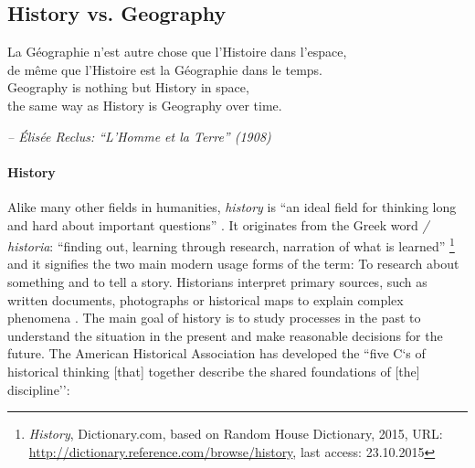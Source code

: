 \subsection{History vs. Geography} %
\label{sub:history_vs_geography}

\begin{quoteit}
La Géographie n’est autre chose que l’Histoire dans l’espace, \\
de même que l’Histoire est la Géographie dans le temps. \\[1.0em]
Geography is nothing but History in space, \\
the same way as History is Geography over time.
\end{quoteit}
\hfill \textit{-- Élisée Reclus: ``L'Homme et la Terre'' (1908)}

\paragraph{History} %
\label{par:history}


Alike many other fields in humanities, \emph{history} is ``an ideal field for thinking long and hard about important questions''
\cite{ahaFiveCs}.
It originates from the Greek word \emph{\textIota\textsigma\texttau\textomikron\textrho\textiota\textalpha / historia}: ``finding out, learning through research, narration of what is learned''
\footnote{
  \emph{History},
  Dictionary.com, based on Random House Dictionary, 2015,
  URL: \url{http://dictionary.reference.com/browse/history},
  last access: 23.10.2015
}
and it signifies the two main modern usage forms of the term: To research about something and to tell a story. Historians interpret primary sources, such as written documents, photographs or historical maps to explain complex phenomena \cite[pp.4-7]{knowles2008placing}. The main goal of history is to study processes in the past to understand the situation in the present and make reasonable decisions for the future. The American Historical Association has developed the ``five C`s of historical thinking [that] together describe the shared foundations of [the] discipline''\cite{ahaFiveCs}:

